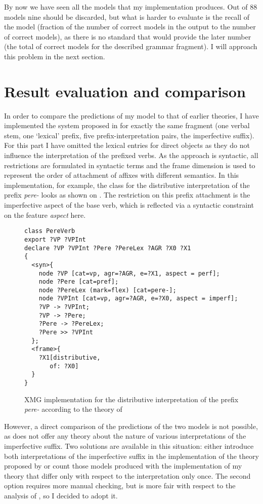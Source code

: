 By now we have seen all the models that my implementation produces. Out of 88 models nine should be discarded, but what is harder to evaluate is the recall of the model (fraction of the number of correct models in the output to the number of correct models), as there is no standard that would provide the later number (the total of correct models for the described grammar fragment). I will approach this problem in the next section.

\section{Result evaluation and comparison}
In order to compare the predictions of my model to that of earlier theories, I have implemented the system proposed in \citet{Tatevosov:09} for exactly the same fragment (one verbal stem, one `lexical' prefix, five prefix-interpretation pairs, the imperfective suffix). For this part I have omitted the lexical entries for direct objects as they do not influence the interpretation of the prefixed verbs. As the approach is syntactic, all restrictions are formulated in syntactic terms and the frame dimension is used to represent the order of attachment of affixes with different semantics. In this implementation, for example, the class for the distributive interpretation of the prefix \textit{pere-} looks as shown on . The restriction on this prefix attachment is the imperfective aspect of the base verb, which is reflected via a syntactic constraint on the feature \textit{aspect} here.

\begin{figure}
\begin{verbatim}
class PereVerb
export ?VP ?VPInt 
declare ?VP ?VPInt ?Pere ?PereLex ?AGR ?X0 ?X1 
{
  <syn>{
    node ?VP [cat=vp, agr=?AGR, e=?X1, aspect = perf];
    node ?Pere [cat=pref];
    node ?PereLex (mark=flex) [cat=pere-];
    node ?VPInt [cat=vp, agr=?AGR, e=?X0, aspect = imperf];
    ?VP -> ?VPInt;
    ?VP -> ?Pere;
    ?Pere -> ?PereLex;
    ?Pere >> ?VPInt
  };
  <frame>{
    ?X1[distributive,
       of: ?X0]
  }
}
\end{verbatim}
\caption{XMG implementation for the distributive interpretation of the prefix \textit{pere-} according to the theory of \citet{Tatevosov:09}\label{xmg:Tat:pere}}
\end{figure}

However, a direct comparison of the predictions of the two models is not possible, as \citet{Tatevosov:09} does not offer any theory about the nature of various interpretations of the imperfective suffix. Two solutions are available in this situation: either introduce both interpretations of the imperfective suffix in the implementation of the theory proposed by \citet{Tatevosov:09} or count those models produced with the implementation of my theory that differ only with respect to the interpretation only once. The second option requires more manual checking, but is more fair with respect to the analysis of \citet{Tatevosov:09}, so I decided to adopt it.


